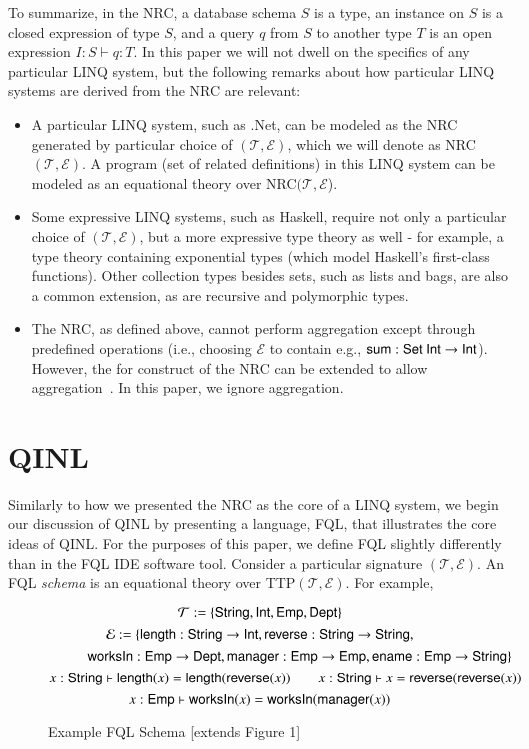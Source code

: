 \documentclass[11pt]{article}
\def\to{\rightarrow}
\theoremstyle{remark}
\theoremstyle{definition}
\begin{document}
To summarize, in the NRC, a database schema $S$ is a type, an instance on $S$ is a closed expression of type $S$, and a query $q$ from $S$ to another type $T$ is an open expression $I : S \vdash q : T$.  In this paper we will not dwell on the specifics of any particular LINQ system, but the following remarks about how particular LINQ systems are derived from the NRC are relevant:
\begin{itemize}
\item A particular LINQ system, such as .Net, can be modeled as the NRC generated by particular choice of $(\mathcal{T}, \mathcal{E})$, which we will denote as NRC$(\mathcal{T}, \mathcal{E})$.  A program (set of related definitions) in this LINQ system can be modeled as an equational theory over NRC$(\mathcal{T},\mathcal{E}$).   
\item Some expressive LINQ systems, such as Haskell, require not only a particular choice of $(\mathcal{T}, \mathcal{E})$, but a more expressive type theory as well - for example, a type theory containing exponential types (which model Haskell's first-class functions).  Other collection types besides sets, such as lists and bags, are also a common extension, as are recursive and polymorphic types.
\item The NRC, as defined above, cannot perform aggregation except through predefined operations (i.e., choosing $\mathcal{E}$ to contain e.g., ${\sf sum : Set \ Int \to Int}$).  However, the {\sf for} construct of the NRC can be extended to allow aggregation~\cite{755736}.  In this paper, we ignore aggregation.
\end{itemize}



\section{QINL}

Similarly to how we presented the NRC as the core of a LINQ system, we begin our discussion of QINL by presenting a language, FQL, that illustrates the core ideas of QINL.  For the purposes of this paper, we define FQL slightly differently than in the FQL IDE software tool.  Consider a particular signature $(\mathcal{T}, \mathcal{E})$.  An FQL {\it schema} is an equational theory over TTP$(\mathcal{T}, \mathcal{E})$. For example,

\begin{figure}[h]
\caption{Example FQL Schema [extends Figure 1]}
$$
\mathcal{T} := \{ {\sf String}, {\sf Int},  {\sf Emp}, {\sf Dept} \}
$$
$$\mathcal{E} := \{ {\sf length} : {\sf String} \to {\sf Int}, {\sf reverse} : {\sf String} \to {\sf String}, $$
$$
\ \ \ \ \ \ \ \ \ \ \ {\sf worksIn} : {\sf Emp} \to {\sf Dept}, {\sf manager} : {\sf Emp} \to {\sf Emp}, {\sf ename} : {\sf Emp} \to {\sf String} \}
$$
$$
 x : {\sf String} \vdash {\sf length}(x) = {\sf length}({\sf reverse}(x))
 \ \ \ \ \ \ \ \ x : {\sf String} \vdash x = {\sf reverse}({\sf reverse}(x))
 $$
 $$
  x : {\sf Emp} \vdash {\sf worksIn}(x) = {\sf worksIn}({\sf manager}(x)) 
$$
\end{figure}
\end{document}
